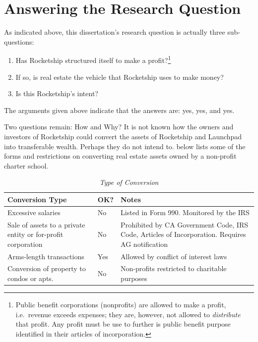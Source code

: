 \section{Answering the Research Question}%
\label{sec:answ-rese-quest}\indent%

As indicated above, this dissertation's research question is actually three sub-questions:
\begin{enumerate}
  \item Has Rocketship structured itself to make a profit?\footnote{Public benefit corporations (nonprofits) are allowed to make a profit, i.e.\ revenue exceeds expenses; they are, however, not allowed to \textit{distribute} that profit. Any profit must be use to further is public benefit purpose identified in their articles of incorporation.}
  \item If so, is real estate the vehicle that Rocketship uses to make money?
  \item Is this Rocketship's intent?
\end{enumerate}

The arguments given above indicate that the answers are: yes, yes, and yes.

Two questions remain: How and Why? It is not known how the owners and investors of Rocketship could convert the assets of Rocketship and Launchpad into transferable wealth. Perhaps they do not intend to.  below lists some of the forms and restrictions on converting real estate assets owned by a non-profit charter school.

\noindent%
\begin{table}[hbtp]
  \caption[Type of Conversion]{\textit{Type of Conversion}}%
  \label{tab:type_conversion}
    \begin{tabulary}{\textwidth}{LLL}
    \toprule
    \textbf{Conversion Type} & \textbf{OK?} & \textbf{Notes} \\
    \midrule
    Excessive salaries & No & Listed in Form 990. Monitored by the IRS \vspace{6pt} \\
    Sale of assets to a private entity or for-profit corporation & No & Prohibited by CA Government Code, IRS Code, Articles of Incorporation. Requires AG notification \vspace{6pt} \\
    Arms-length transactions & Yes & Allowed by conflict of interest laws \vspace{6pt} \\
    Conversion of property to condos or apts. & No & Non-profits restricted to charitable purposes \\
    \bottomrule
  \end{tabulary}
\end{table}

